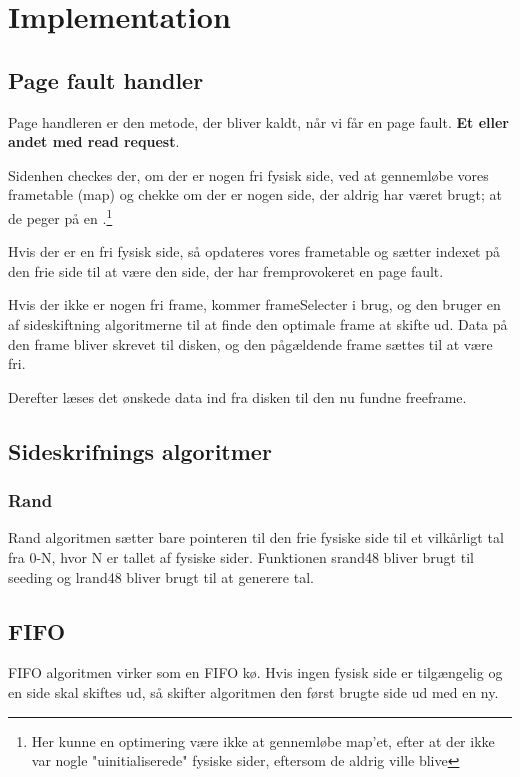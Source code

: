 \section{Implementation}

\subsection{Page fault handler}
Page handleren er den metode, der bliver kaldt, når vi får en page fault. \textbf{Et eller andet med read request}.

Sidenhen checkes der, om der er nogen fri fysisk side, ved at gennemløbe vores frametable (map) og chekke om der er nogen side, der aldrig har været brugt; at de peger på en .\footnote{Her kunne en optimering være ikke at gennemløbe map'et, efter at der ikke var nogle "uinitialiserede" fysiske sider, eftersom de aldrig ville blive} 

Hvis der er en fri fysisk side, så opdateres vores frametable og sætter indexet på den frie side til at være den side, der har fremprovokeret en page fault.

Hvis der ikke er nogen fri frame, kommer frameSelecter i brug, og den bruger en af sideskiftning algoritmerne til at finde den optimale frame at skifte ud. Data på den frame bliver skrevet til disken, og den pågældende frame sættes til at være fri. 

Derefter læses det ønskede data ind fra disken til den nu fundne freeframe.

\subsection{Sideskrifnings algoritmer}


\subsubsection{Rand}
Rand algoritmen sætter bare pointeren til den frie fysiske side til et vilkårligt tal fra 0-N, hvor N er tallet af fysiske sider. Funktionen srand48 bliver brugt til seeding og lrand48 bliver brugt til at generere tal.

\subsection{FIFO}
FIFO algoritmen virker som en FIFO kø. Hvis ingen fysisk side er tilgængelig og en side skal skiftes ud, så skifter algoritmen den først brugte side ud med en ny.

